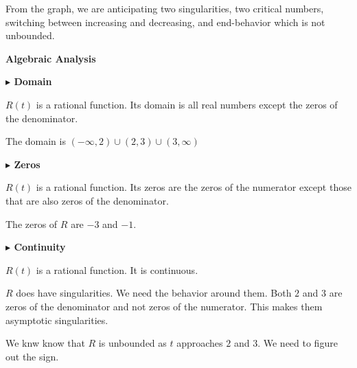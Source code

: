 \documentclass{ximera}
\begin{document}
From the graph, we are anticipating two singularities, two critical numbers, switching between increasing and decreasing, and end-behavior which is not unbounded. 








\textbf{\textcolor{purple!65!blue}{Algebraic Analysis}} 






























\textbf{\textcolor{blue!55!black}{$\blacktriangleright$ Domain}} 

$R(t)$ is a rational function.  Its domain is all real numbers except the zeros of the denominator. 

The domain is $(-\infty, 2) \cup (2,3) \cup (3, \infty)$  














\textbf{\textcolor{blue!55!black}{$\blacktriangleright$ Zeros}} 


$R(t)$ is a rational function.  Its zeros are the zeros of the numerator except those that are also zeros of the denominator. 


The zeros of $R$ are $-3$ and $-1$. 






\textbf{\textcolor{blue!55!black}{$\blacktriangleright$ Continuity}} 


$R(t)$ is a rational function.  It is continuous. 


$R$ does have singularities.  We need the behavior around them.   Both $2$ and $3$ are zeros of the denominator and not zeros of the numerator.  This makes them asymptotic singularities. 


We knw know that $R$ is unbounded as $t$ approaches $2$ and $3$.  We need to figure out the sign. 
\end{document}
